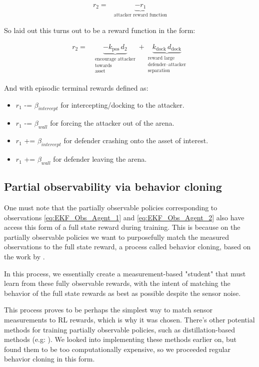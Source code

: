 \[
\boxed{
\begin{aligned}
r_2
= {}&
\underbrace{-r_1}_{\text{attacker reward function}}
\end{aligned}
}
\]

So laid out this turns out to be a reward function in the form:

\begin{equation}
\label{eq:defender_step_reward}
\boxed{
\begin{aligned}
r_2
= {}&
\underbrace{-k_{\text{pos}}\, d_2}_{\substack{\text{encourage attacker}\\\text{towards}\\\text{asset}}}
+
\underbrace{k_{\text{dock}}\, d_{\text{dock}}}_{\substack{\text{reward large}\\\text{defender--attacker}\\\text{separation}}}
\end{aligned}
}
\end{equation}

And with episodic terminal rewards defined as:

\begin{itemize}
    \item $r_1$ -= $\beta_{intercept}$ for intercepting/docking to the attacker.
    \item $r_1$ -= $\beta_{wall}$ for forcing the attacker out of the arena.
    \item $r_1$ += $\beta_{intercept}$ for defender crashing onto the asset of interest.
    \item $r_1$ += $\beta_{wall}$ for defender leaving the arena.
    
\end{itemize}

\subsection{Partial observability via behavior cloning}

One must note that the partially observable policies corresponding to observations \ref{eq:EKF_Obs_Agent_1} and \ref{eq:EKF_Obs_Agent_2} also have access this form of a full state reward during training. This is because on the partially observable policies we want to purposefully match the measured observations to the full state reward, a process called behavior cloning, based on the work by \cite{ross2011reduction}.

In this process, we essentially create a measurement-based "student" that must learn from these fully observable rewards, with the intent of matching the behavior of the full state rewards as best as possible despite the sensor noise.

This process proves to be perhaps the simplest way to match sensor measurements to RL rewards, which is why it was chosen. There's other potential methods for training partially observable policies, such as distillation-based methods (e.g: \cite{bajcsy2024learning}). We looked into implementing these methods earlier on, but found them to be too computationally expensive, so we proceeded regular behavior cloning in this form. 
